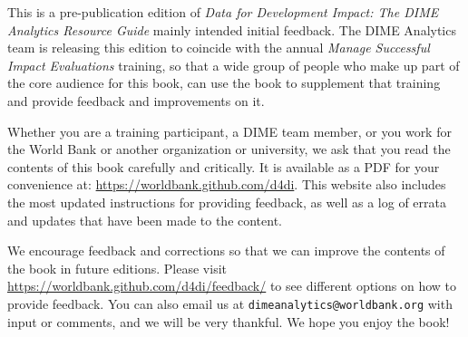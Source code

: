 This is a pre-publication edition of
\textit{Data for Development Impact:
The DIME Analytics Resource Guide} mainly intended initial feedback.
The DIME Analytics team is releasing this edition
to coincide with the annual \textit{Manage Successful Impact Evaluations} training,
so that a wide group of people who make up
part of the core audience for this book,
can use the book to supplement that training
and provide feedback and improvements on it.

Whether you are a training participant,
a DIME team member, or you work for the World Bank
or another organization or university,
we ask that you read the contents of this book carefully and critically.
It is available as a PDF for your convenience at:
\url{https://worldbank.github.com/d4di}.
This website also includes the most updated instructions
for providing feedback, as well as
a log of errata and updates that have been made to the content.

We encourage feedback and corrections
so that we can improve the contents of the book
in future editions. Please visit 
\url{https://worldbank.github.com/d4di/feedback/} to 
see different options on how to provide feedback.
You can also email us at \texttt{dimeanalytics@worldbank.org}
with input or comments, and we will be very thankful.
We hope you enjoy the book!

